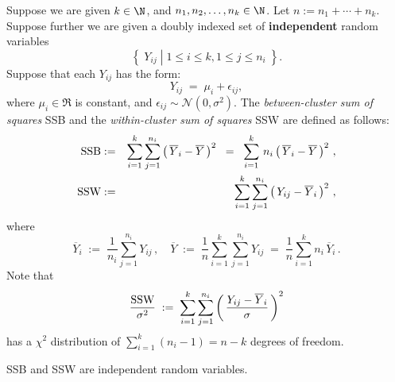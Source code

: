\documentclass{article}
\begin{document}
Suppose we are given $k \in \N$, and $n_{1},n_{2},\ldots,n_{k} \in\N$.  Let $n := n_{1} + \cdots + n_{k}$.
Suppose further we are given a doubly indexed set of \textbf{independent} random variables
\begin{equation*}
\left\{\; \left. Y_{ij} \;\right\vert\;  1 \leq i \leq k, 1 \leq j \leq n_{i} \;\right\}.
\end{equation*}
Suppose that each $Y_{ij}$ has the form:
\begin{equation*}
    Y_{ij} \; = \; \mu_{i} + \epsilon_{ij},
\end{equation*}
where $\mu_{i} \in \Re$ is constant, and $\epsilon_{ij} \sim \mathcal{N}(0,\sigma^{2})$.
The \emph{between-cluster sum of squares} SSB and the \emph{within-cluster sum of squares} SSW are defined as follows:
\begin{eqnarray*}
\textnormal{SSB} & := &
\sum^{k}_{i=1}\sum^{n_{i}}_{j=1}\left(\,\overline{Y}_{i}-\overline{Y}\,\right)^{2}
\;\;=\;\;
\sum^{k}_{i=1}\,n_{i}\left(\,\overline{Y}_{i}-\overline{Y}\,\right)^{2} \,, \\
\textnormal{SSW} & := &
\sum^{k}_{i=1}\sum^{n_{i}}_{j=1}\left(\,Y_{ij} - \overline{Y}_{i}\,\right)^{2}\,,
\end{eqnarray*}
where
\begin{equation*}
\overline{Y}_{i} \; := \; \dfrac{1}{n_{i}}\sum^{n_{i}}_{j=1}Y_{ij}\,,
\quad
\overline{Y} \; := \; \dfrac{1}{n}\sum^{k}_{i=1}\sum^{n_{i}}_{j=1}Y_{ij} \; = \; \dfrac{1}{n}\sum^{k}_{i=1}n_{i}\,\overline{Y}_{i} \,.
\end{equation*}
Note that
\begin{equation*}
\dfrac{\textnormal{SSW}}{\sigma^{2}} \; := \;
\sum^{k}_{i=1}\sum^{n_{i}}_{j=1}\left(\,\dfrac{Y_{ij} - \overline{Y}_{i}}{\sigma}\,\right)^{2}
\end{equation*}
has a $\chi^{2}$ distribution of $\sum^{k}_{i=1}(n_{i}-1) = n - k$ degrees of freedom.
\begin{theorem}\quad
SSB and SSW are independent random variables.
\end{theorem}
\end{document}
